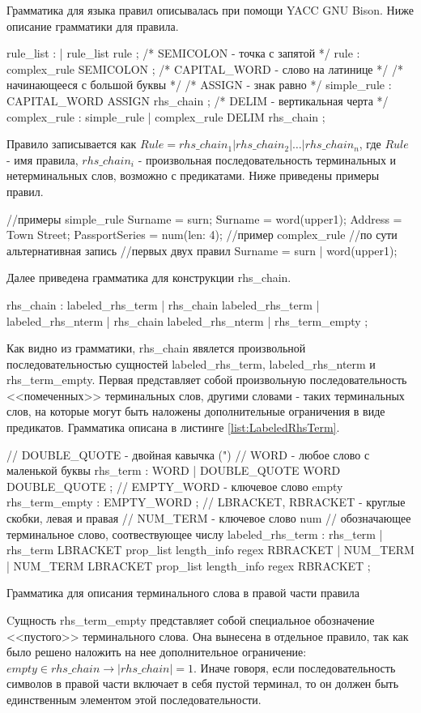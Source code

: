 Грамматика для языка правил описывалась при помощи YACC GNU Bison. Ниже описание грамматики для правила.
\begin{Verb}
rule_list
    : %
    | rule_list rule
    ;
/* SEMICOLON - точка с запятой */
rule 
    : complex_rule SEMICOLON
    ;
/* CAPITAL_WORD - слово на латинице */
/* начинающееся с большой буквы */
/* ASSIGN - знак равно */
simple_rule
    : CAPITAL_WORD ASSIGN rhs_chain
    ;
/* DELIM - вертикальная черта */
complex_rule
    : simple_rule
    | complex_rule DELIM rhs_chain
    ;
\end{Verb}
Правило записывается как $Rule = rhs\_chain_1 | rhs\_chain_2 | \dots | rhs\_chain_n$, где $Rule$ - имя правила, $rhs\_chain_i$ - произвольная последовательность терминальных и нетерминальных слов, возможно с предикатами. Ниже приведены примеры правил.
\begin{Verb}
//примеры simple_rule
Surname = surn;
Surname = word(upper1);
Address = Town Street;
PassportSeries = num(len: 4);
//пример complex_rule
//по сути альтернативная запись
//первых двух правил
Surname = surn | word(upper1);
\end{Verb}
Далее приведена грамматика для конструкции rhs\_chain.
\begin{Verb}
rhs_chain
    : labeled_rhs_term
    | rhs_chain labeled_rhs_term
    | labeled_rhs_nterm
    | rhs_chain labeled_rhs_nterm
    | rhs_term_empty
    ;
\end{Verb}
Как видно из грамматики, rhs\_chain явялется произвольной последовательностью сущностей labeled\_rhs\_term, labeled\_rhs\_nterm и rhs\_term\_empty. Первая представляет собой произвольную последовательность <<помеченных>> терминальных слов, другими словами - таких терминальных слов, на которые могут быть наложены дополнительные ограничения в виде предикатов. Грамматика описана в листинге \ref{list:LabeledRhsTerm}.
\begin{ListingEnv}
\begin{Verb}
// DOUBLE_QUOTE - двойная кавычка (")
// WORD - любое слово с маленькой буквы
rhs_term
    : WORD
    | DOUBLE_QUOTE WORD DOUBLE_QUOTE
    ;
// EMPTY_WORD - ключевое слово empty
rhs_term_empty
    : EMPTY_WORD
    ;
// LBRACKET, RBRACKET - круглые скобки, левая и правая
// NUM_TERM - ключевое слово num
// обозначающее терминальное слово, соотвествующее числу
labeled_rhs_term
    : rhs_term
    | rhs_term LBRACKET prop_list length_info regex RBRACKET
    | NUM_TERM
    | NUM_TERM LBRACKET prop_list length_info regex RBRACKET
    ;
\end{Verb}
\caption{Грамматика для описания терминального слова в правой части правила}
\label{list:LabeledRhsTerm}
\end{ListingEnv}
Cущность rhs\_term\_empty представляет собой специальное обозначение <<пустого>> терминального слова. Она вынесена в отдельное правило, так как было решено наложить на нее дополнительное ограничение: $empty \in rhs\_chain \rightarrow |rhs\_chain| = 1$. Иначе говоря, если последовательность символов в правой части включает в себя пустой терминал, то он должен быть единственным элементом этой последовательности.

